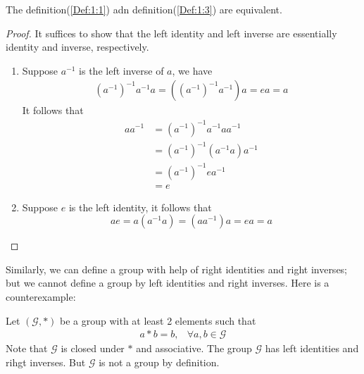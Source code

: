 \begin{proposition}
The definition(\ref{Def:1:1}) adn definition(\ref{Def:1:3}) are equivalent.
\end{proposition}
\begin{proof}
It suffices to show that the left identity and left inverse are essentially identity and inverse, respectively.
\begin{enumerate}
\item
Suppose $a^{-1}$ is the left inverse of $a$, we have
\begin{align*}
(a^{-1})^{-1}a^{-1}a = ((a^{-1})^{-1}a^{-1})a=ea=a
\end{align*}
It follows that
\begin{align*}
aa^{-1}&=(a^{-1})^{-1}a^{-1}aa^{-1}\\
&=(a^{-1})^{-1}(a^{-1}a)a^{-1}\\
&=(a^{-1})^{-1}ea^{-1}\\
&=e
\end{align*}
\item
Suppose $e$ is the left identity, it follows that
\[
ae = a(a^{-1}a) = (aa^{-1})a=ea=a
\]
\end{enumerate}
\end{proof}
Similarly, we can define a group with help of right identities and right inverses; but we cannot define a group by left identities and right inverses. Here is a counterexample:
\begin{example}
Let $(\mathcal{G},*)$ be a group with at least 2 elements such that
\[
\begin{array}{ll}
a*b = b,
&
\forall a,b\in\mathcal{G}
\end{array}
\]
Note that $\mathcal{G}$ is closed under $*$ and associative. The group $\mathcal{G}$ has left identities and rihgt inverses. But $\mathcal{G}$ is not a group by definition.
\end{example}

